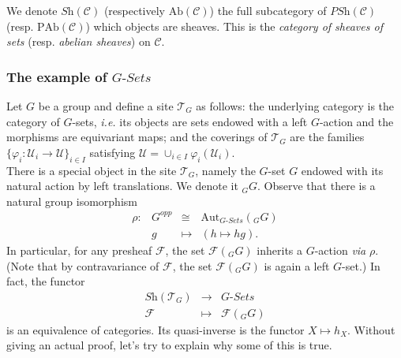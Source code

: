 \begin{definition}
We denote $\textit{Sh}(\mathcal{C})$ (respectively $\text{Ab}(\mathcal{C})$) the full subcategory of $\textit{PSh}(\mathcal{C})$ (resp. $\text{PAb}(\mathcal{C})$) which objects are sheaves. This is the \emph{category of sheaves of sets} (resp. \emph{abelian sheaves}) on $\mathcal{C}$.
\end{definition}

\subsubsection{The example of $G\textit{-Sets}$}
\label{subsubsection:GSets}

Let $G$ be a group and define a site $\mathcal{T}_G$ as follows: the underlying category is the category of $G$-sets, {\it i.e.} its objects are sets endowed with a left $G$-action and the morphisms are equivariant maps; and the coverings of $\mathcal{T}_G$ are the families $\{\varphi_i : \mathcal{U}_i \to \mathcal{U} \}_{i\in I}$ satisfying $\mathcal{U} = \cup_{i\in I} \varphi_i (\mathcal{U}_i)$. 
\\
There is a special object in the site $\mathcal{T}_G$, namely the $G$-set $G$ endowed with its natural action by left translations. We denote it ${}_G G$. Observe that there is a natural group isomorphism
$$
\begin{array}{rccl}
\rho: & G^{opp} & \cong & \text{Aut}_{G\textit{-Sets}}({}_G G) \\
& g & \longmapsto & (h \mapsto hg).
\end{array}
$$
In particular, for any presheaf $\mathcal{F}$, the set $\mathcal{F}({}_G G)$  inherits a $G$-action \emph{via} $\rho$. (Note that by contravariance of $\mathcal{F}$, the set $\mathcal{F}({}_G G)$ is again a left $G$-set.) In fact, the functor 
$$
\begin{array}{rcl}
\textit{Sh}(\mathcal{T}_G) & \longrightarrow & G\textit{-Sets} \\
\mathcal{F} & \longmapsto & \mathcal{F}({}_G G)
\end{array}
$$
is an equivalence of categories. Its quasi-inverse is the functor $X \mapsto h_X$. Without giving an actual proof, let's try to explain why some of this is true.

